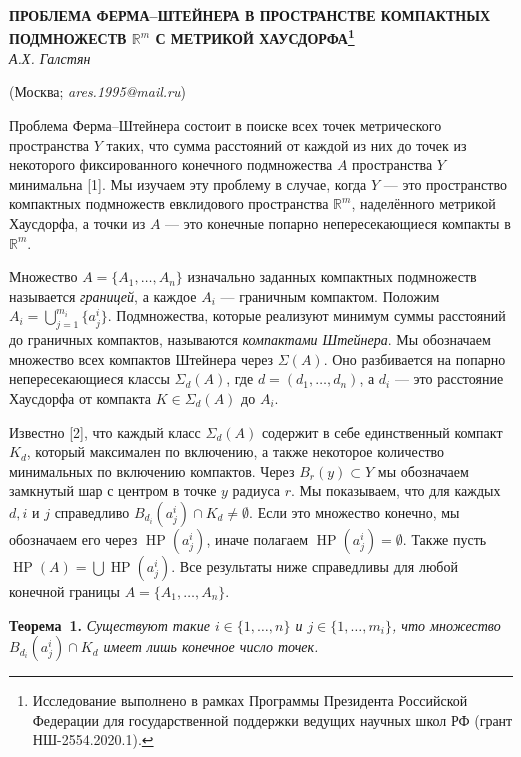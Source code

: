 
\begin{center}
    {\bf ПРОБЛЕМА ФЕРМА--ШТЕЙНЕРА В ПРОСТРАНСТВЕ КОМПАКТНЫХ ПОДМНОЖЕСТВ $\mathbb{R}^m$ С МЕТРИКОЙ ХАУСДОРФА\footnote{Исследование выполнено в рамках Программы Президента Российской Федерации для государственной поддержки ведущих научных школ РФ (грант НШ-2554.2020.1).}}\\

    {\it А.Х. Галстян}

    (Москва; {\it ares.1995@mail.ru})
\end{center}


Проблема Ферма--Штейнера состоит в поиске всех точек метрического пространства $Y$ таких, что сумма расстояний от каждой из них до точек из некоторого фиксированного конечного подмножества $A$ пространства $Y$ минимальна [1]. Мы изучаем эту проблему в случае, когда $Y$ --- это пространство компактных подмножеств евклидового пространства $\mathbb{R}^m$, наделённого метрикой Хаусдорфа, а точки из $A$ --- это конечные попарно непересекающиеся компакты в $\mathbb{R}^m$.

Множество $A = \{A_1, \ldots, A_n\}$ изначально заданных компактных подмножеств называется \emph{границей}, а каждое $A_i$ — граничным компактом. Положим $A_i = \bigcup_{j=1}^{m_i} \{a^i_j\}$. Подмножества, которые реализуют минимум суммы расстояний до граничных компактов, называются \emph{компактами Штейнера}. Мы обозначаем множество всех компактов Штейнера через $\Sigma(A)$. Оно разбивается на попарно непересекающиеся классы $\Sigma_d(A)$, где $d = (d_1, \ldots, d_n)$, а $d_i$ --- это расстояние Хаусдорфа от компакта $K\in \Sigma_d(A)$ до $A_i$.

Известно [2], что каждый класс $\Sigma_d(A)$ содержит в себе единственный компакт $K_d$, который максимален по включению, а также некоторое количество минимальных по включению компактов. Через $B_r(y) \subset Y$ мы обозначаем замкнутый шар с центром в точке $y$ радиуса $r$. Мы показываем, что для каждых $d, i$ и $j$ справедливо $B_{d_i} (a^i_j) \cap K_d \neq \emptyset$. Если это множество конечно, мы обозначаем его через $\operatorname{HP}(a^i_j)$, иначе полагаем $\operatorname{HP}(a^i_j)=\emptyset$. Также пусть $\operatorname{HP}(A)=\bigcup \operatorname{HP}(a^i_j)$. Все результаты ниже справедливы для любой конечной границы $A = \{A_1,\ldots,A_n\}$.

\textbf{Теорема~1.} {\it Существуют такие $i \in \{1,\ldots,n\}$ и $j \in \{1,\ldots,m_i\}$, что множество $B_{d_i} (a^i_j) \cap K_d$ имеет лишь конечное число точек.}

